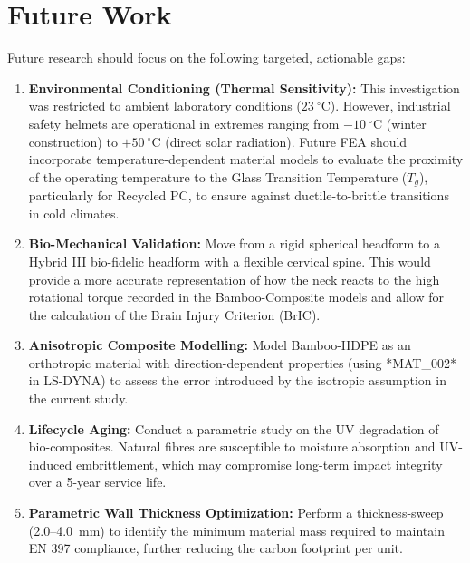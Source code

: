 \section{Future Work}
Future research should focus on the following targeted, actionable gaps:
\begin{enumerate}
    \item \textbf{Environmental Conditioning (Thermal Sensitivity):} This investigation was restricted to ambient laboratory conditions ($23~^\circ$C). However, industrial safety helmets are operational in extremes ranging from $-10~^\circ$C (winter construction) to $+50~^\circ$C (direct solar radiation). Future FEA should incorporate temperature-dependent material models to evaluate the proximity of the operating temperature to the Glass Transition Temperature ($T_g$), particularly for Recycled PC, to ensure against ductile-to-brittle transitions in cold climates.
    \item \textbf{Bio-Mechanical Validation:} Move from a rigid spherical headform to a Hybrid III bio-fidelic headform with a flexible cervical spine. This would provide a more accurate representation of how the neck reacts to the high rotational torque recorded in the Bamboo-Composite models and allow for the calculation of the Brain Injury Criterion (BrIC).
    \item \textbf{Anisotropic Composite Modelling:} Model Bamboo-HDPE as an orthotropic material with direction-dependent properties (using *MAT\_002* in LS-DYNA) to assess the error introduced by the isotropic assumption in the current study.
    \item \textbf{Lifecycle Aging:} Conduct a parametric study on the UV degradation of bio-composites. Natural fibres are susceptible to moisture absorption and UV-induced embrittlement, which may compromise long-term impact integrity over a 5-year service life.
    \item \textbf{Parametric Wall Thickness Optimization:} Perform a thickness-sweep (2.0--4.0~mm) to identify the minimum material mass required to maintain EN 397 compliance, further reducing the carbon footprint per unit.
\end{enumerate}

